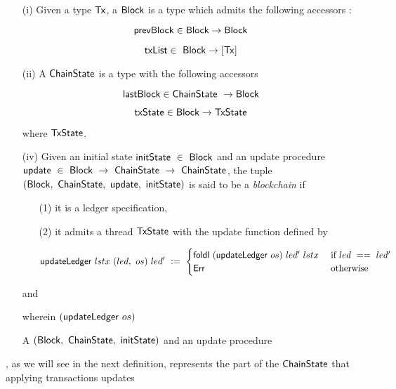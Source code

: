 \begin{definition}
  \begin{itemize}
    \item[(i)] Given a type $\mathsf{Tx}$, a $\mathsf{Block}$ is a type which admits
    the following accessors :

    \[ \mathsf{prevBlock} \in \mathsf{Block} \to \mathsf{Block} \]

    \[ \mathsf{txList} \in~\mathsf{Block} \to [\mathsf{Tx}] \]


    \item[(ii)] A $\mathsf{ChainState}$ is a type with the following accessors

    \[ \mathsf{lastBlock} \in \mathsf{ChainState}~\to \mathsf{Block} \]

    \[ \mathsf{txState} \in \mathsf{Block} \to \mathsf{TxState}  \]

    where $\mathsf{TxState}$.

    \item[(iv)] Given an initial state $\mathsf{initState}~\in~\mathsf{Block}$ and an update procedure
    $\mathsf{update}~\in~\mathsf{Block}~\to~\mathsf{ChainState}~\to~\mathsf{ChainState}$, the tuple
    $(\mathsf{Block},~\mathsf{ChainState},~\mathsf{update},~\mathsf{initState})$ is said to be a
    \emph{blockchain} if

    \begin{itemize}
      \item[(1)] it is a ledger specification,

      \item[(2)] it admits a thread $\mathsf{TxState}$ with the update function defined by

     \[ \mathsf{updateLedger} ~lstx ~(led,~ os)~ led'~ \mathrel{\mathop:}=~ \begin{cases}
       \mathsf{foldl}~(\mathsf{updateLedger}~os)~led'~lstx & \text { if } led~==~led' \\
       \mathsf{Err} & \text{ otherwise}
     \end{cases}  \]

    \end{itemize}

     and

    wherein $(\mathsf{updateLedger}~os)$

    A  $(\mathsf{Block},~\mathsf{ChainState},~\mathsf{initState})$
    and an update procedure


  \end{itemize}

  , as we will see in the next definition, represents the
  part of the $\mathsf{ChainState}$ that applying transactions updates

\end{definition}

